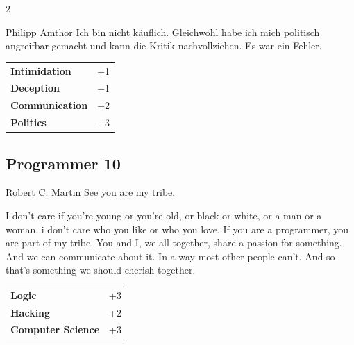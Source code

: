 \begin{multicols}{2}
\begin{tcolorbox}
\begin{pquote}{Philipp Amthor}
Ich bin nicht käuflich. Gleichwohl habe ich mich politisch angreifbar gemacht und kann die Kritik nachvollziehen. Es war ein Fehler.
\end{pquote}

\vspace{3mm}

\begin{tabular}{@{}ll@{}}
    \textbf{Intimidation} & +1\\
    \textbf{Deception} & +1\\
    \textbf{Communication} & +2\\
    \textbf{Politics} & +3\\
\end{tabular}


\end{tcolorbox}

\begin{tcolorbox}
    \subsection*{Programmer \hfill \small{10 }}
    \tcblower


\begin{pquote}{Robert C. Martin}
See you are my tribe.

I don't care if you're young or you're old, or black or white, or a man or a woman. i don't care who you like or who you love. If you are a programmer, you are part of my tribe. You and I, we all together, share a passion for something. And we can communicate about it. In a way most other people can't. And so that's something we should cherish together.
\end{pquote}

\vspace{3mm}

\begin{tabular}{@{}ll@{}}
    \textbf{Logic} & +3\\
    \textbf{Hacking} & +2\\
    \textbf{Computer Science} & +3\\
\end{tabular}


\end{tcolorbox}
\end{multicols}
